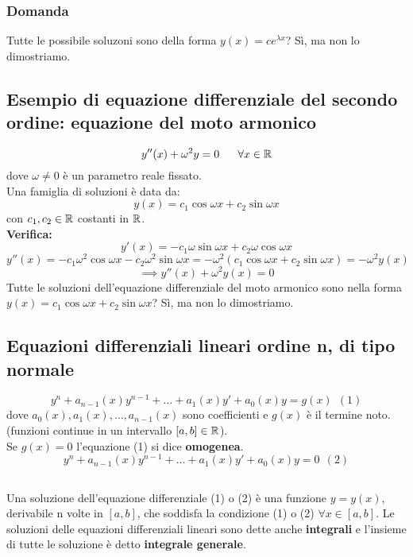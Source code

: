 \documentclass[../../main.tex]{subfiles}
\begin{document}
\subsubsection{Domanda}
Tutte le possibile soluzoni sono della forma $y(x) = ce^{\lambda x}$? Sì, ma
non lo dimostriamo.

\subsection{Esempio di equazione differenziale del secondo ordine: equazione del moto armonico}
\[
    y''(x) + \omega^2 y = 0 \ \ \ \ \ \forall x \in \R
\]
dove $\omega \ne 0$ è un parametro reale fissato.\\ Una famiglia di soluzioni è
data da:
\[
    y(x) = c_1\cos{\omega x} + c_2\sin{\omega x}
\]
con $c_1, c_2 \in \mathbb{R}$ costanti in $\mathbb{R}$.\\ \textbf{Verifica:}\\
\[
    y'(x) = -c_1\omega\sin{\omega x} + c_2\omega\cos{\omega x}
\]
\[
    y''(x) = -c_1\omega^2\cos{\omega x} - c_2\omega^2\sin{\omega x} = -\omega^2 (c_1\cos{\omega x} + c_2\sin{\omega x}) = -\omega^2 y(x)
\]
\[
    \implies y''(x) + \omega^2 y(x) = 0
\]
Tutte le soluzioni dell'equazione differenziale del moto armonico sono nella
forma $y(x) = c_1\cos{\omega x} + c_2\sin{\omega x}$? Sì, ma non lo
dimostriamo.

\subsection{Equazioni differenziali lineari ordine n, di tipo normale}
\[
    y^n + a_{n-1}(x)y^{n-1}+\ldots+a_1(x)y'+a_0(x)y = g(x) \ \ (1)
\]
dove $a_0(x), a_1(x), \ldots, a_{n-1}(x)$ sono coefficienti e $g(x)$ è il
termine noto. (funzioni continue in un intervallo $[a, b] \in \mathbb{R}$).\\ Se $g(x)
    = 0$ l'equazione (1) si dice \textbf{omogenea}.
\[
    y^n + a_{n-1}(x)y^{n-1}+\ldots+a_1(x)y'+a_0(x)y = 0 \ \ (2)
\]

\subsection{}
Una soluzione dell'equazione differenziale (1) o (2) è una funzione $y = y(x)$,
derivabile n volte in $[a, b]$, che soddisfa la condizione (1) o (2) $\forall x
    \in [a, b]$. Le soluzioni delle equazioni differenziali lineari sono dette
anche \textbf{integrali} e l'insieme di tutte le soluzione è detto
\textbf{integrale generale}.
\end{document}
